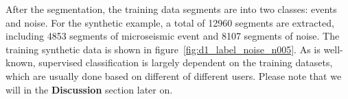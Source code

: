After the segmentation, the training data segments are  into two classes: events and noise. For the synthetic example, a total of 12960 segments are extracted, including 4853 segments of microseismic event and 8107 segments of noise. The  training synthetic data is shown in figure~\ref{fig:d1_label_noise_n005}. As is well-known, supervised classification is largely dependent on the  training datasets, which are usually done based on different  of different users. Please note that we will  in the \textbf{Discussion} section later on. 

